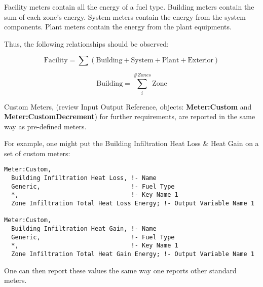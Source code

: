 Facility meters contain all the energy of a fuel type. Building meters contain the sum of each zone’s energy. System meters contain the energy from the system components. Plant meters contain the energy from the plant equipments.

Thus, the following relationships should be observed:

\begin{equation}
  \text{Facility} = \sum\left(\text{Building} + \text{System} + \text{Plant} + \text{Exterior}\right)
\end{equation}

\begin{equation}
  \text{Building} = \sum_{i}^{\#Zones} \text{Zone}
\end{equation}

Custom Meters, (review Input Output Reference, objects: \textbf{Meter:Custom} and \textbf{Meter:CustomDecrement}) for further requirements, are reported in the same way as pre-defined meters.

For example, one might put the Building Infiltration Heat Loss \& Heat Gain on a set of custom meters:

\begin{lstlisting}
Meter:Custom,
  Building Infiltration Heat Loss, !- Name
  Generic,                         !- Fuel Type
  *,                               !- Key Name 1
  Zone Infiltration Total Heat Loss Energy; !- Output Variable Name 1

Meter:Custom,
  Building Infiltration Heat Gain, !- Name
  Generic,                         !- Fuel Type
  *,                               !- Key Name 1
  Zone Infiltration Total Heat Gain Energy; !- Output Variable Name 1
\end{lstlisting}

One can then report these values the same way one reports other standard meters.
